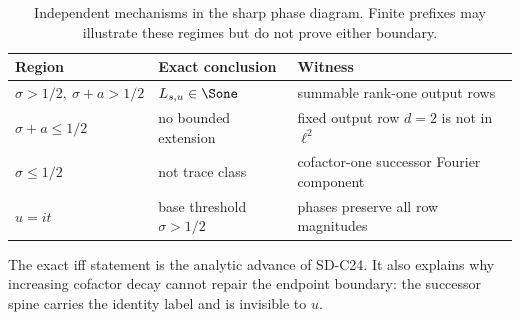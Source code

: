 \begin{table}[t]
\centering
\small
\caption{Independent mechanisms in the sharp phase diagram.  Finite
prefixes may illustrate these regimes but do not prove either boundary.}
\label{tab:phase}
\begin{tabularx}{\textwidth}{L{0.21\textwidth}L{0.24\textwidth}Y}
\toprule
Region & Exact conclusion & Witness \\
\midrule
\(\sigma>1/2,\ \sigma+a>1/2\)
& \(L_{s,u}\in\Sone\)
& summable rank-one output rows \\
\(\sigma+a\le1/2\)
& no bounded extension
& fixed output row \(d=2\) is not in \(\ell^2\) \\
\(\sigma\le1/2\)
& not trace class
& cofactor-one successor Fourier component \\
\(u=it\)
& base threshold \(\sigma>1/2\)
& phases preserve all row magnitudes \\
\bottomrule
\end{tabularx}
\end{table}

The exact iff statement is the analytic advance of SD-C24.  It also explains
why increasing cofactor decay cannot repair the endpoint boundary: the
successor spine carries the identity label and is invisible to \(u\).
